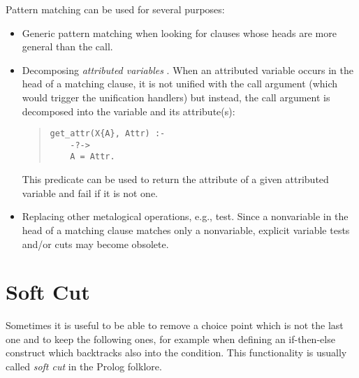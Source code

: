 Pattern matching can be used for several purposes:
\begin{itemize}
\item Generic pattern matching when looking for clauses
whose heads are more general than the call.

\item Decomposing {\it attributed variables} \cite{eclipseext}.
When an attributed variable occurs in the head of a matching clause,
it is not unified with the call argument (which would trigger
the unification handlers) but instead, the call argument
is decomposed into the variable and its attribute(s):
\begin{quote}
\begin{verbatim}
get_attr(X{A}, Attr) :-
    -?->
    A = Attr.
\end{verbatim}
\end{quote}
This predicate can be used to return the attribute of a given
attributed variable and fail if it is not one.

\item Replacing other metalogical operations,
e.g., 
test. Since a nonvariable in the head of a matching clause
matches only a nonvariable, explicit variable tests and/or cuts
may become obsolete.
\end{itemize}



\section{Soft Cut}
Sometimes it is useful to be able to remove a choice point which is
not the last one and to keep the following ones, for example
when defining an if-then-else construct which backtracks also
into the condition.
This functionality is usually called {\it soft cut} in the Prolog
folklore.

